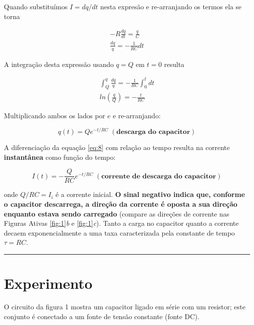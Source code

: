 \documentclass[a4paper,12pt]{article}
\begin{document}
Quando substituímos $I=dq/dt$ nesta expresão e re-arranjando os termos ela se torna

\begin{gather*}
    -R \frac{dq}{dt} = \frac{q}{C}\\
    \frac{dq}{q} = -\frac{1}{RC}dt
\end{gather*}

A integração desta expressão usando $q=Q$ em $t=0$ resulta

\begin{gather*}
    \int_{Q}^{q} \frac{dq}{q} = - \frac{1}{RC} \int_{0}^{t} dt\\
    ln\left( \frac{q}{Q} \right) = - \frac{t}{RC}
\end{gather*}

Multiplicando ambos os lados por $e$ e re-arranjando:

\begin{equation} \label{eq:8}
q(t) = Qe^{-t/RC}\;(\textbf{descarga do capacitor})
\end{equation}


A diferenciação da equação \ref{eq:8} com relação ao tempo resulta na corrente \textbf{instantânea} como função do tempo:

\begin{equation} \label{e:8}
I(t) = -\frac{Q}{RC}e^{-t/RC}\;(\textbf{corrente de descarga do capacitor})
\end{equation}

onde $Q/RC = I_i$ é a corrente inicial. \textbf{O sinal negativo indica que, conforme o capacitor descarrega, a direção da corrente é oposta a sua direção enquanto estava sendo carregado} (compare as direções de corrente nas Figuras Ativas \hbox{\ref{fig:1}\textit{b}} e \hbox{\ref{fig:1}\textit{c}).} Tanto a carga no capacitor quanto a corrente decaem exponencialmente a uma taxa caracterizada pela constante de tempo \hbox{$\tau = RC$.}

\vspace{5.0ex}
\hrule{}


 
\section{Experimento }

O circuito da figura 1 mostra um capacitor ligado em série com um resistor; este conjunto é conectado a um fonte de tensão constante (fonte DC).
\vspace{5.0ex} 
\end{document}
